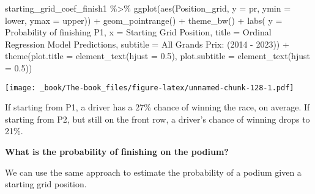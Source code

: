 \documentclass[
]{book}
\newenvironment{Shaded}{\begin{snugshade}}{\end{snugshade}}
\newcommand{\AttributeTok}[1]{\textcolor[rgb]{0.77,0.63,0.00}{#1}}
\newcommand{\FloatTok}[1]{\textcolor[rgb]{0.00,0.00,0.81}{#1}}
\newcommand{\FunctionTok}[1]{\textcolor[rgb]{0.00,0.00,0.00}{#1}}
\newcommand{\NormalTok}[1]{#1}
\newcommand{\SpecialCharTok}[1]{\textcolor[rgb]{0.00,0.00,0.00}{#1}}
\newcommand{\StringTok}[1]{\textcolor[rgb]{0.31,0.60,0.02}{#1}}
\begin{document}
\begin{Shaded}
\begin{Highlighting}[]
\NormalTok{starting\_grid\_coef\_finish1 }\SpecialCharTok{\%\textgreater{}\%}
  \FunctionTok{ggplot}\NormalTok{(}\FunctionTok{aes}\NormalTok{(Position\_grid, }\AttributeTok{y =}\NormalTok{ pr, }\AttributeTok{ymin =}\NormalTok{ lower, }\AttributeTok{ymax =}\NormalTok{ upper)) }\SpecialCharTok{+}
  \FunctionTok{geom\_pointrange}\NormalTok{() }\SpecialCharTok{+}
  \FunctionTok{theme\_bw}\NormalTok{() }\SpecialCharTok{+}
  \FunctionTok{labs}\NormalTok{( }\AttributeTok{y =} \StringTok{\textquotesingle{}Probability of finishing P1\textquotesingle{}}\NormalTok{,}
        \AttributeTok{x =} \StringTok{\textquotesingle{}Starting Grid Position\textquotesingle{}}\NormalTok{,}
       \AttributeTok{title =} \StringTok{\textquotesingle{}Ordinal Regression Model Predictions\textquotesingle{}}\NormalTok{,}
       \AttributeTok{subtitle =} \StringTok{\textquotesingle{}All Grands Prix: (2014 {-} 2023)\textquotesingle{}}\NormalTok{) }\SpecialCharTok{+}
  \FunctionTok{theme}\NormalTok{(}\AttributeTok{plot.title =} \FunctionTok{element\_text}\NormalTok{(}\AttributeTok{hjust =} \FloatTok{0.5}\NormalTok{),}
        \AttributeTok{plot.subtitle =} \FunctionTok{element\_text}\NormalTok{(}\AttributeTok{hjust =} \FloatTok{0.5}\NormalTok{))}
\end{Highlighting}
\end{Shaded}

\texttt{[image: \_book/The-book\_files/figure-latex/unnamed-chunk-128-1.pdf]}

If starting from P1, a driver has a 27\% chance of winning the race, on average. If starting from P2, but still on the front row, a driver's chance of winning drops to 21\%.

\textbf{What is the probability of finishing on the podium?}

We can use the same approach to estimate the probability of a podium given a starting grid position.
\end{document}
